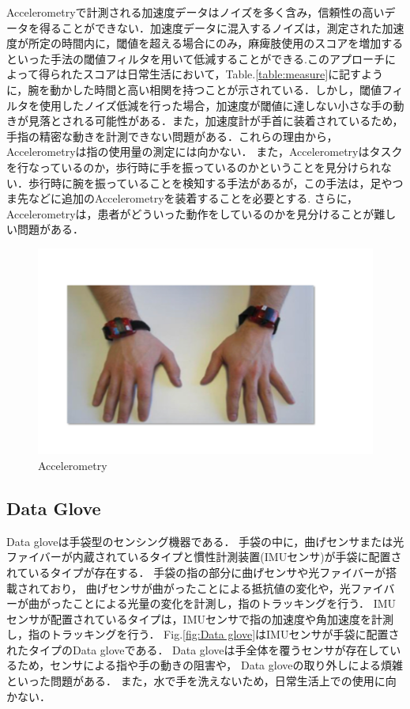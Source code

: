 Accelerometryで計測される加速度データはノイズを多く含み，信頼性の高いデータを得ることができない．加速度データに混入するノイズは，測定された加速度が所定の時間内に，閾値を超える場合にのみ，麻痺肢使用のスコアを増加するといった手法の閾値フィルタを用いて低減することができる.このアプローチによって得られたスコアは日常生活において，Table.\ref{table:measure}に記すように，腕を動かした時間と高い相関を持つことが示されている．しかし，閾値フィルタを使用したノイズ低減を行った場合，加速度が閾値に達しない小さな手の動きが見落とされる可能性がある．また，加速度計が手首に装着されているため，手指の精密な動きを計測できない問題がある．これらの理由から，Accelerometryは指の使用量の測定には向かない\cite{Uswatte2000}．
また，Accelerometryはタスクを行なっているのか，歩行時に手を振っているのかということを見分けられない．歩行時に腕を振っていることを検知する手法があるが，この手法は，足やつま先などに追加のAccelerometryを装着することを必要とする\cite{Ullery2015}.
さらに，Accelerometryは，患者がどういった動作をしているのかを見分けることが難しい問題がある\cite{Hayward2016}．
\begin{figure}[H]
  \centering
  \includegraphics[width=0.8\linewidth]{fig/ch1/acc}
  \caption{Accelerometry\cite{Chen2005}}
  \label{fig:Accelerometry}
\end{figure}



\subsection*{Data Glove}
Data glove\cite{Lin2018,Tarchanidis2003}は手袋型のセンシング機器である．
手袋の中に，曲げセンサまたは光ファイバーが内蔵されているタイプと慣性計測装置(IMUセンサ)が手袋に配置されているタイプが存在する．
手袋の指の部分に曲げセンサや光ファイバーが搭載されており，
曲げセンサが曲がったことによる抵抗値の変化や，光ファイバーが曲がったことによる光量の変化を計測し，指のトラッキングを行う．
IMUセンサが配置されているタイプは，IMUセンサで指の加速度や角加速度を計測し，指のトラッキングを行う．
Fig.\ref{fig:Data glove}はIMUセンサが手袋に配置されたタイプのData gloveである．
Data gloveは手全体を覆うセンサが存在しているため，センサによる指や手の動きの阻害や，
Data gloveの取り外しによる煩雑といった問題がある．
また，水で手を洗えないため，日常生活上での使用に向かない．


